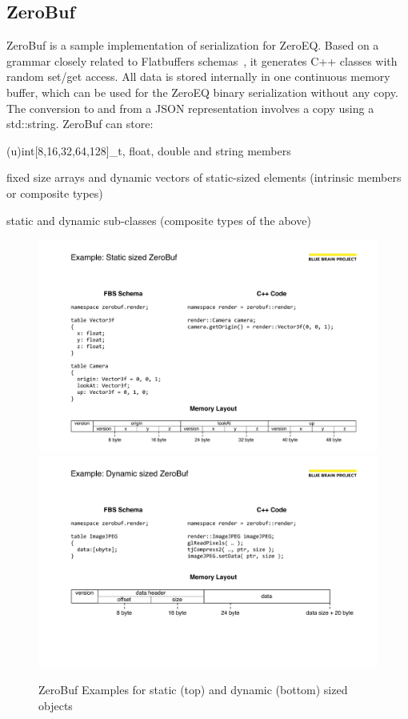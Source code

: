 \documentclass[10pt]{llncs}
\begin{document}
\subsection{ZeroBuf}

ZeroBuf is a sample implementation of serialization for ZeroEQ. Based on a
grammar closely related to Flatbuffers schemas~\cite{flatbuffers}, it generates
C++ classes with random \textsf{set/get} access. All data is stored internally
in one continuous memory buffer, which can be used for the ZeroEQ binary
serialization without any copy. The conversion to and from a JSON representation
involves a copy using a \textsf{std::string}. ZeroBuf can store:

\begin{compactitem}
\item (u)int[8,16,32,64,128]\_t, float, double and string members
\item fixed size arrays and dynamic vectors of static-sized elements (intrinsic
members or composite types)
\item static and dynamic sub-classes (composite types of the above)
\end{compactitem}

\begin{figure}[ht]\center
  \includegraphics[width=\columnwidth]{images/ZeroBufStatic}\\\vspace{4ex}
  \includegraphics[width=\columnwidth]{images/ZeroBufDynamic}
  \caption{\label{fZeroBuf}ZeroBuf Examples for static (top) and dynamic
(bottom) sized objects}
\end{figure}
\end{document}
